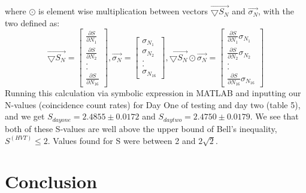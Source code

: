 \documentclass{article}
\begin{document}
    where $\odot$ is element wise multiplication between vectors $\vec{\bigtriangledown S_N}$ and $\vec{\sigma_N}$, with the two defined as:
    \begin{equation}
        \vec{\bigtriangledown S_N} = \begin{bmatrix}
        \frac{\partial{S}}{\partial{N_1}}\\\frac{\partial{S}}{\partial{N_2}}\\.\\.\\\frac{\partial{S}}{\partial{N_{16}}} 
        \end{bmatrix},\vec{\sigma_N} = \begin{bmatrix}\sigma_{N_1}\\\sigma_{N_2}\\.\\.\\\sigma_{N_{16}} \end{bmatrix},\vec{\bigtriangledown S_N} \odot \vec{\sigma_N} = \begin{bmatrix} \frac{\partial{S}}{\partial{N_1}}\sigma_{N_1}\\\frac{\partial{S}}{\partial{N_2}}\sigma_{N_2}\\.\\.\\\frac{\partial{S}}{\partial{N_{16}}}\sigma_{N_{16}} \end{bmatrix}
    \end{equation}
    Running this calculation via symbolic expression in MATLAB and inputting our N-values (coincidence count rates) for Day One of testing and day two (table 5), and we get $S_{day one} = 2.4855 \pm 0.0172$ and $S_{day two} = 2.4750 \pm 0.0179$. We see that both of these S-values are well above the upper bound of Bell's inequality, $S^{(HVT)}\leq 2$. Values found for S were between 2 and $2\sqrt{2}$.


\section{Conclusion}
\end{document}
